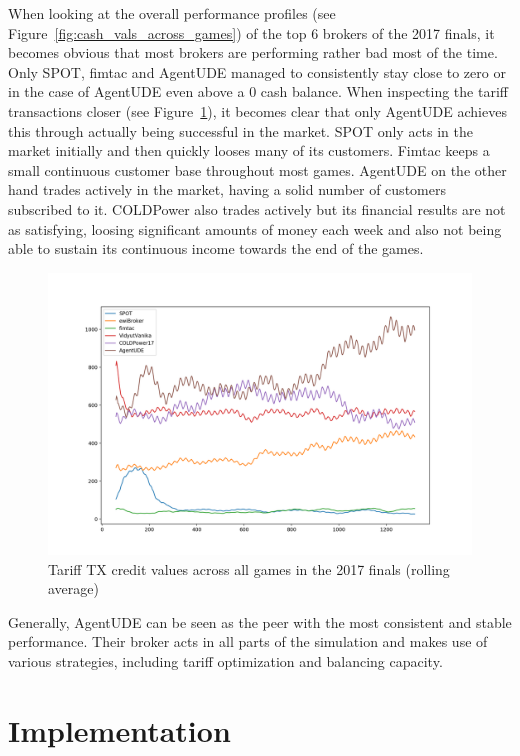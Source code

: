 When looking at the overall performance profiles (see Figure~\ref{fig:cash_vals_across_games}) of the top 6 brokers of
the 2017 finals, it becomes obvious that most brokers are performing rather bad most of the time. Only SPOT, fimtac and
AgentUDE managed to consistently stay close to zero or in the case of AgentUDE even above a 0 cash balance. When
inspecting the tariff transactions closer (see Figure~\ref{fig:allttxucline}), it becomes clear that only AgentUDE
achieves this through actually being successful in the market. SPOT only acts in the market initially and then quickly
looses many of its customers. Fimtac keeps a small continuous customer base throughout most games. AgentUDE on the other
hand trades actively in the market, having a solid number of customers subscribed to it.  COLDPower also trades actively
but its financial results are not as satisfying, loosing significant amounts of money each week and also not being able
to sustain its continuous income towards the end of the games.
\begin{figure}[]
    \centering
    \includegraphics[width=1.0\linewidth]{img/all-ttx-uc-line.png}
    \caption{Tariff TX credit values across all games in the 2017 finals (rolling average)}
    \label{fig:allttxucline}
\end{figure}

Generally, AgentUDE can be seen as the peer with the most consistent and stable performance. Their broker acts in all
parts of the simulation and makes use of various strategies, including tariff optimization and balancing capacity.

\section{Implementation }
\label{sec:implementation}

